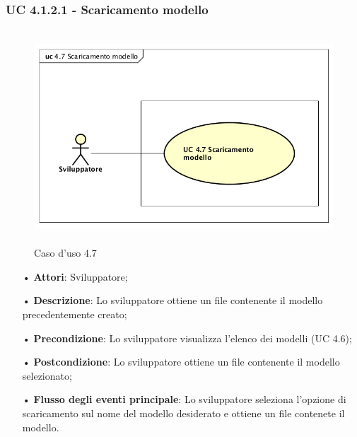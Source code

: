 \subsubsection{UC 4.1.2.1 - Scaricamento modello}
\begin{figure}[H]
\centering
\includegraphics[width=17cm, height=8cm]{img/UC470.png} 
\caption{Caso d'uso 4.7}\label{fig:470}
\end{figure}
\begin{itemize}
\item[•]\textbf{Attori}: Sviluppatore;
\item[•]\textbf{Descrizione}: Lo sviluppatore ottiene un file contenente il modello precedentemente creato;
\item[•]\textbf{Precondizione}: Lo sviluppatore visualizza l'elenco dei modelli (UC 4.6);
\item[•]\textbf{Postcondizione}: Lo sviluppatore ottiene un file contenente il modello selezionato;
\item[•]\textbf{Flusso degli eventi principale}:  Lo sviluppatore seleziona l'opzione di scaricamento sul nome del modello desiderato e ottiene un file contenete il modello.
\end{itemize}

